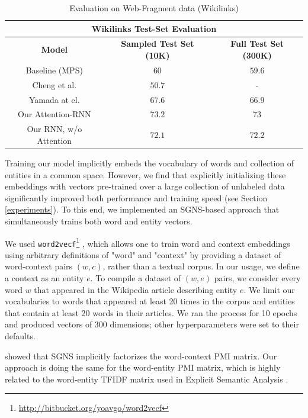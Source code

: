 \documentclass[11pt]{article}
\begin{document}
	\begin{table}[t]
		\begin{center}
			\begin{tabular}{|c| c | c | }
				\hline \multicolumn{3}{|c|}{Wikilinks Test-Set Evaluation} \\
				\hline \bf Model               & \bf Sampled Test Set (10K)  & \bf Full Test Set (300K)  \\
				Baseline (MPS)                 & $60$   & $59.6$ \\
				Cheng et al.                   & $50.7$ & - \\
				Yamada at el.                  & $67.6$ & $66.9$ \\
				\hline
				Our Attention-RNN              & $73.2$ & $73$ \\
				Our RNN, w/o Attention         & $72.1$   & $72.2$ \\
				\hline
			\end{tabular}
		\end{center}
		\caption{\label{tab:wikilink} Evaluation on Web-Fragment data (Wikilinks)}
	\end{table}
	
	Training our model implicitly embeds the vocabulary of words and collection of entities in a common space. However, we find that explicitly initializing these embeddings with vectors pre-trained over a large collection of unlabeled data significantly improved both performance and training speed (see Section \ref{experiments}). To this end, we implemented an SGNS-based approach \cite{mikolov2013distributed} that simultaneously trains both word and entity vectors.
	
	We used \texttt{word2vecf}\footnote{\url{http://bitbucket.org/yoavgo/word2vecf}} \cite{levy2014dependency}, which allows one to train word and context embeddings using arbitrary definitions of "word" and "context" by providing a dataset of word-context pairs $(w,c)$, rather than a textual corpus. In our usage, we define a context as an entity $e$. To compile a dataset of $(w,e)$ pairs, we consider every word $w$ that appeared in the Wikipedia article describing entity $e$. We limit our vocabularies to words that appeared at least 20 times in the corpus and entities that contain at least 20 words in their articles. We ran the process for 10 epochs and produced vectors of 300 dimensions; other hyperparameters were set to their defaults.
	
	 showed that SGNS implicitly factorizes the word-context PMI matrix. Our approach is doing the same for the word-entity PMI matrix, which is highly related to the word-entity TFIDF matrix used in Explicit Semantic Analysis \cite{gabrilovich2007computing}.
	
\end{document}
